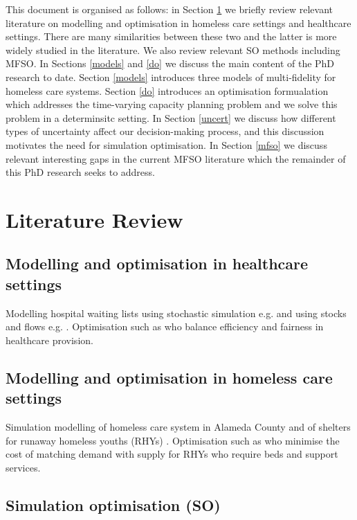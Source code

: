 \documentclass{article}
\begin{document}
This document is organised as follows: in Section \ref{lit-rev} we briefly review relevant literature on modelling and optimisation in homeless care settings and healthcare settings. There are many similarities between these two and the latter is more widely studied in the literature. We also review relevant SO methods including MFSO. In Sections \ref{models} and \ref{do} we discuss the main content of the PhD research to date. Section \ref{models} introduces three models of multi-fidelity for homeless care systems. Section \ref{do} introduces an optimisation formualation which addresses the time-varying capacity planning problem and we solve this problem in a determinsitc setting. In Section \ref{uncert} we discuss how different types of uncertainty affect our decision-making process, and this discussion motivates the need for simulation optimisation. In Section \ref{mfso} we discuss relevant interesting gaps in the current MFSO literature which the remainder of this PhD research seeks to address.

\section{Literature Review} \label{lit-rev}

\subsection{Modelling and optimisation in healthcare settings}

Modelling hospital waiting lists using stochastic simulation e.g. \cite{wood2022supporting} and using stocks and flows e.g. \cite{worthington1991hospital}. Optimisation such as \cite{argyris2022fair} who balance efficiency and fairness in healthcare provision. 

\subsection{Modelling and optimisation in homeless care settings}

Simulation modelling of homeless care system in Alameda County \citep{singham2023discrete} and of shelters for runaway homeless youths (RHYs) \citep{kaya2022discrete}. Optimisation such as \cite{kaya2022improving} who minimise the cost of matching demand with supply for RHYs who require beds and support services.

\subsection{Simulation optimisation (SO)}
\end{document}
